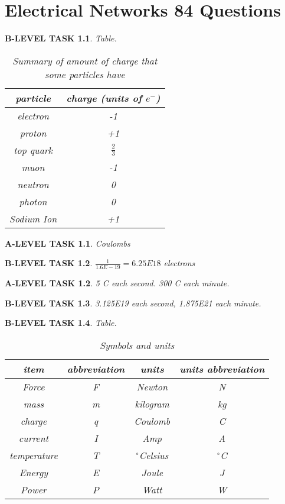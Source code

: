 \documentclass{book}
\numberwithin{equation}{section}
\newtheorem{alevel}{A-LEVEL TASK}
\newtheorem{blevel}{B-LEVEL TASK}
\theoremstyle{definition}
\begin{document}
\chapter{Electrical Networks 84 Questions}
\begin{blevel}Table.\par
\begin{table}[H]
\begin{center}
\begin{tabular}{|c|c|} \hline
particle	&	charge (units of $e^-$) \\ \hline
electron	&	-1\\ \hline
proton		&	+1\\ \hline
top quark	&	$\frac{2}{3}$\\ \hline
muon		&	-1\\ \hline
neutron		&	0\\ \hline
photon		&	0\\ \hline
Sodium Ion	&	+1\\ \hline
\end{tabular}
\caption{Summary of amount of charge that some particles have}
\label{T:2EP}
\end{center}
\end{table}
\end{blevel}

\begin{alevel}Coulombs\end{alevel}
\begin{blevel}$\frac{1}{1.6E-19}=6.25E18$ electrons\end{blevel}
\begin{alevel}5 C each second. 300 C each minute.\end{alevel}
\begin{blevel}3.125E19 each second, 1.875E21 each minute.\end{blevel}

\begin{blevel}Table.\par
\begin{table}[H]
\begin{center}
\begin{tabular}{|c|c|c|c|} \hline
item	&	abbreviation & units & units abbreviation \\ \hline
Force	&	F	& Newton	& N\\ \hline
mass	&	m	& kilogram	&	kg	\\ \hline
charge	& q	& Coulomb& C	\\ \hline
current		&I&Amp&A	\\ \hline
temperature		&T&$^\circ$Celsius&$^\circ$C	\\ \hline
Energy	&E&Joule&J	\\ \hline
Power	&P&Watt&W	\\ \hline
\end{tabular}
\caption{Symbols and units}
\label{F:2SU}
\end{center}
\end{table}
\end{blevel}
\end{document}
